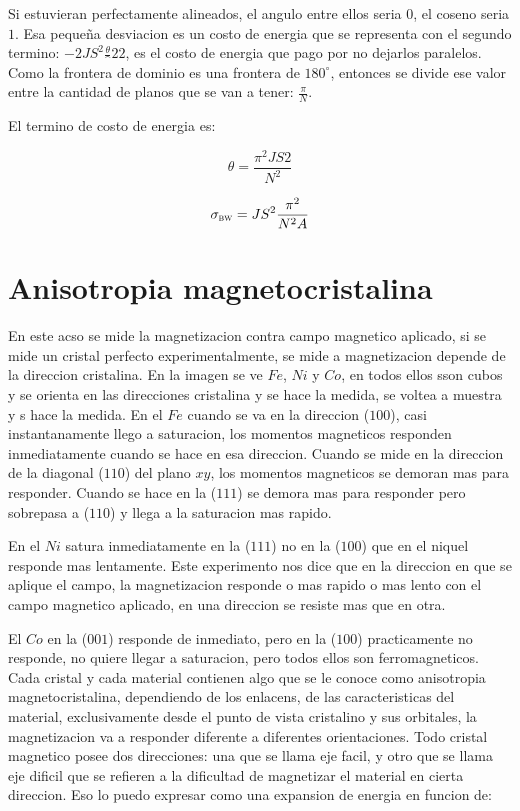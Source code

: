 \documentclass[11pt,fleqn]{book}
\begin{document}
Si estuvieran perfectamente alineados, el angulo entre ellos seria $0$, el coseno seria $1$. Esa pequeña desviacion es un costo de energia que se representa con el segundo termino: $-2JS^{2}\frac\theta^{2}{2}$, es el costo de energia que pago por no dejarlos paralelos. Como la frontera de dominio es una frontera de $180^{\circ}$, entonces se divide ese valor entre la cantidad de planos que se van a tener: $\frac{\pi}{N}$. 

El termino de costo de energia es:

\begin{equation}
    \theta=\frac{\pi^{2}JS{2}}{N^{2}}
\end{equation}

\begin{equation}
    \sigma_{\textsc{bw}}=JS^{2}\frac{\pi^{2}}{N^{2}A}
\end{equation}

\section*{Anisotropia magnetocristalina}


En este acso se mide la magnetizacion contra campo magnetico aplicado, si se mide un cristal perfecto experimentalmente, se mide a magnetizacion depende de la direccion cristalina. En la imagen se ve $Fe$, $Ni$ y $Co$, en todos ellos sson cubos y se orienta en las direcciones cristalina y se hace la medida, se voltea a muestra y s hace la medida. En el $Fe$ cuando se va en la direccion ($100$), casi instantanamente llego a saturacion, los momentos magneticos responden inmediatamente cuando se hace en esa direccion. Cuando se mide en la direccion de la diagonal ($110$) del plano $xy$, los momentos magneticos se demoran mas para responder. Cuando se hace en la ($111$) se demora mas para responder pero sobrepasa a ($110$) y llega a la saturacion mas rapido. 

En el $Ni$ satura inmediatamente en la ($111$) no en la ($100$) que en el niquel responde mas lentamente. Este experimento nos dice que en la direccion en que se aplique el campo, la magnetizacion responde o mas rapido o mas lento con el campo magnetico aplicado, en una direccion se resiste mas que en otra. 

El $Co$ en la ($001$) responde de inmediato, pero en la ($100$) practicamente no responde, no quiere llegar a saturacion, pero todos ellos son ferromagneticos. Cada cristal y cada material contienen algo que se le conoce como anisotropia magnetocristalina, dependiendo de los enlacens, de las caracteristicas del material, exclusivamente desde el punto de vista cristalino y sus orbitales, la magnetizacion va a responder diferente a diferentes orientaciones. Todo cristal magnetico posee dos direcciones: una que se llama eje facil, y otro que se llama eje dificil que se refieren a la dificultad de magnetizar el material en cierta direccion.  Eso lo puedo expresar como una expansion de energia en funcion de:
\end{document}
